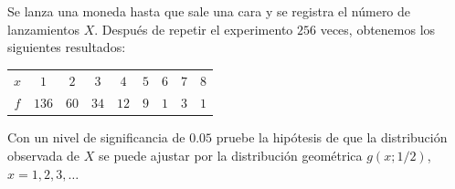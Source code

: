\begin{enunciado}
 Se lanza una moneda hasta que sale una cara y se registra el n\'umero
 de lanzamientos $X$.
 Despu\'es de repetir el experimento $256$ veces,
 obtenemos los siguientes resultados:
 \begin{center}
  \begin{tabular}{c|cccccccc}
   $x$ &  $1$  &  $2$ &  $3$ &  $4$ & $5$ & $6$ & $7$ & $8$ \\
   $f$ & $136$ & $60$ & $34$ & $12$ & $9$ & $1$ & $3$ & $1$
  \end{tabular}
 \end{center}
 Con un nivel de significancia de $0.05$ pruebe la hip\'otesis
 de que la distribuci\'on observada de $X$ se puede ajustar
 por la distribuci\'on geom\'etrica $g(x;1/2)$, $x = 1,2,3,\ldots$
\end{enunciado}

